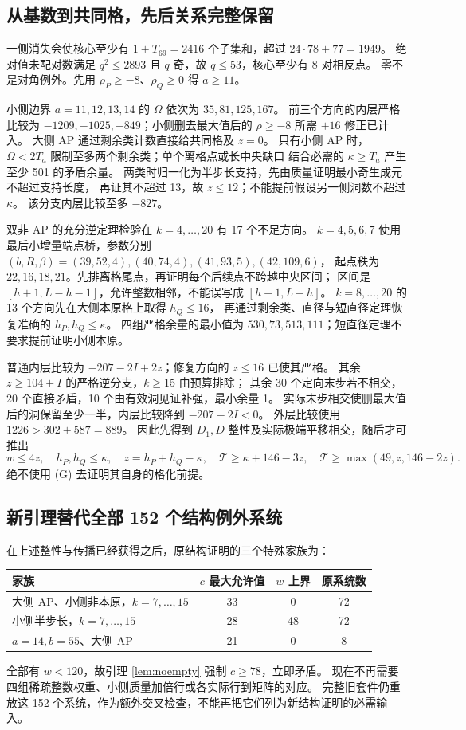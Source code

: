 \documentclass[11pt,a4paper]{article}
\newcommand{\T}{\mathcal T}
\begin{document}
\subsection*{从基数到共同格，先后关系完整保留}
一侧消失会使核心至少有 $1+T_{69}=2416$ 个子集和，超过 $24\cdot78+77=1949$。
绝对值未配对数满足 $q^2\le2893$ 且 $q$ 奇，故 $q\le53$，核心至少有 8 对相反点。
零不是对角例外。先用 $\rho_P\ge-8$、$\rho_Q\ge0$ 得 $a\ge11$。

小侧边界 $a=11,12,13,14$ 的 $\Omega$ 依次为 $35,81,125,167$。
前三个方向的内层严格比较为 $-1209,-1025,-849$；小侧删去最大值后的
$\rho\ge-8$ 所需 $+16$ 修正已计入。
大侧 AP 通过剩余类计数直接给共同格及 $z=0$。
只有小侧 AP 时，$\Omega<2T_a$ 限制至多两个剩余类；单个离格点或长中央缺口
结合必需的 $\kappa\ge T_a$ 产生至少 501 的矛盾余量。
两类时归一化为半步长支持，先由质量证明最小奇生成元不超过支持长度，
再证其不超过 13，故 $z\le12$；不能提前假设另一侧洞数不超过 $\kappa$。
该分支内层比较至多 $-827$。

双非 AP 的充分逆定理检验在 $k=4,\ldots,20$ 有 17 个不足方向。
$k=4,5,6,7$ 使用最后小增量端点桥，参数分别
$(b,R,\beta)=(39,52,4),(40,74,4),(41,93,5),(42,109,6)$，
起点秩为 $22,16,18,21$。先排离格尾点，再证明每个后续点不跨越中央区间；
区间是 $[h+1,L-h-1]$，允许整数相邻，不能误写成 $[h+1,L-h]$。
$k=8,\ldots,20$ 的 13 个方向先在大侧本原格上取得 $h_Q\le16$，
再通过剩余类、直径与短直径定理恢复准确的 $h_P,h_Q\le\kappa$。
四组严格余量的最小值为 $530,73,513,111$；短直径定理不要求提前证明小侧本原。

普通内层比较为 $-207-2I+2z$；修复方向的 $z\le16$ 已使其严格。
其余 $z\ge104+I$ 的严格逆分支，$k\ge15$ 由预算排除；
其余 30 个定向末步若不相交，20 个直接矛盾，10 个由有效洞见证补强，最小余量 1。
实际末步相交使删最大值后的洞保留至少一半，内层比较降到 $-207-2I<0$。
外层比较使用 $1226>302+587=889$。
因此先得到 $D_1,D$ 整性及实际极端平移相交，随后才可推出
\[
w\le4z,\quad h_P,h_Q\le\kappa,\quad z=h_P+h_Q-\kappa,
\quad \T\ge\kappa+146-3z,\quad\T\ge\max(49,z,146-2z).
\tag{G}
\]
绝不使用 (G) 去证明其自身的格化前提。

\subsection*{新引理替代全部 152 个结构例外系统}
在上述整性与传播已经获得之后，原结构证明的三个特殊家族为：
\begin{center}\small
\begin{tabular}{lccc}
\toprule 家族 & $c$ 最大允许值 & $w$ 上界 & 原系统数\\\midrule
大侧 AP、小侧非本原，$k=7,\ldots,15$ &33&0&72\\
小侧半步长，$k=7,\ldots,15$ &28&48&72\\
$a=14,b=55$、大侧 AP &21&0&8\\\bottomrule
\end{tabular}
\end{center}
全部有 $w<120$，故引理 \ref{lem:noempty} 强制 $c\ge78$，立即矛盾。
现在不再需要四组稀疏整数权重、小侧质量加倍行或各实际行到矩阵的对应。
完整旧套件仍重放这 152 个系统，作为额外交叉检查，不能再把它们列为新结构证明的必需输入。
\end{document}
